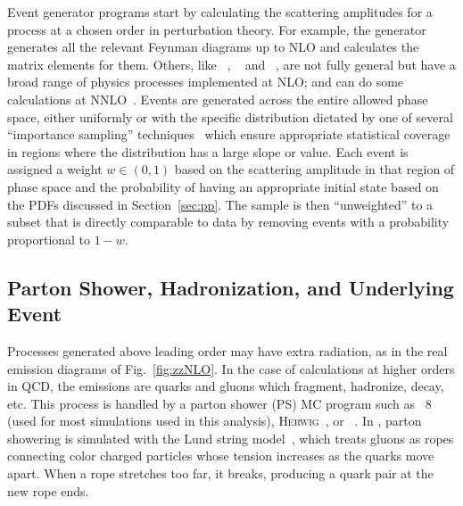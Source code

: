Event generator programs start by calculating the scattering amplitudes for a process at a chosen order in perturbation theory.
For example, the generator {\MGAMC}~\cite{Alwall:2014hca} generates all the relevant Feynman diagrams up to NLO and calculates the matrix elements for them.
Others, like {\POWHEG}~\cite{Nason:2004rx,Frixione:2007vw,Alioli:2010xd}, {\SHERPA}~\cite{Gleisberg:2008ta} and {\MCFM}~\cite{Campbell:1999ah,Campbell:2011bn,Campbell:2015qma}, are not fully general but have a broad range of physics processes implemented at NLO\@; {\SHERPA} and {\MCFM} can do some calculations at NNLO~\cite{Boughezal:2016wmq}.
Events are generated across the entire allowed phase space, either uniformly or with the specific distribution dictated by one of several ``importance sampling'' techniques~\cite{Lepage:1977sw,Olive:2016xmw} which ensure appropriate statistical coverage in regions where the distribution has a large slope or value.
Each event is assigned a weight $w \in (0,1)$ based on the scattering amplitude in that region of phase space and the probability of having an appropriate initial state based on the PDFs discussed in Section~\ref{sec:pp}.
The sample is then ``unweighted'' to a subset that is directly comparable to data by removing events with a probability proportional to $1 - w$.


\subsection{Parton Shower, Hadronization, and Underlying Event}\label{sec:partonShower}

Processes generated above leading order may have extra radiation, as in the real emission diagrams of Fig.~\ref{fig:zzNLO}.
In the case of calculations at higher orders in QCD, the emissions are quarks and gluons which fragment, hadronize, decay, etc.
This process is handled by a parton shower (PS) MC program such as {\PYTHIA}~8~\cite{Sjostrand:2014zea} (used for most simulations used in this analysis), \textsc{Herwig}~\cite{Bahr:2008pv,Bellm:2015jjp}, or {\SHERPA}~\cite{Gleisberg:2008ta}.
In {\PYTHIA}, parton showering is simulated with the Lund string model~\cite{Andersson:1978vj,Andersson:1983jt, Andersson:2001yu,Olive:2016xmw}, which treats gluons as ropes connecting color charged particles whose tension increases as the quarks move apart.
When a rope stretches too far, it breaks, producing a quark pair at the new rope ends.

